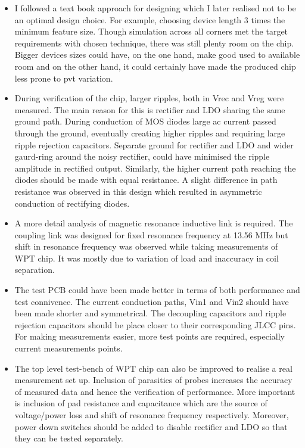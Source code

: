 \documentclass[12pt,a4paper,UKenglish]{report}
\begin{document}
\begin{itemize}
\item I followed a text book approach for designing which I later realised not to be an optimal design choice. For example, choosing device length 3 times the minimum feature size. Though simulation across all corners 
met the target requirements with chosen technique, there was still plenty room on the chip. Bigger devices sizes could have, on the one hand, make good used to available room and on the other hand, it could certainly have made the produced chip less prone to \acrshort{pvt} variation. 
\item During verification  of the chip, larger ripples, both in Vrec and Vreg were measured. The main reason for this is rectifier and LDO sharing the same ground path. 
During conduction of MOS diodes large ac current passed through the ground, eventually creating higher ripples and requiring large ripple rejection capacitors. Separate ground for rectifier and LDO and wider gaurd-ring around the noisy rectifier, could have minimised the ripple amplitude in rectified output. Similarly, the higher current path reaching the diodes should be made with equal resistance. A slight difference in path resistance was observed in this design which resulted in asymmetric conduction of rectifying diodes. 
\item A more detail analysis of magnetic resonance inductive link is required. The coupling link was designed for fixed resonance frequency at 13.56 MHz but shift in resonance frequency was observed while taking measurements of WPT chip. It was 
mostly due to variation of load and inaccuracy in coil separation. %
\item The test PCB could have been made better in terms of both performance and test connivence. The current conduction paths, Vin1 and Vin2 should have been made shorter and symmetrical. The decoupling capacitors and ripple rejection capacitors should be place closer to their corresponding JLCC pins. For making measurements easier, more test points are required, especially current measurements points.
\item The top level test-bench of WPT chip can also be improved to realise a real measurement set up. Inclusion of parasitics of probes increases the accuracy of measured data and hence the verification of performance.  More important is inclusion of pad resistance and capacitance which are the source of voltage/power loss and shift of resonance frequency respectively. Moreover, power down switches should be added to disable rectifier and LDO so that they can be tested separately.
\end{itemize}
\end{document}

